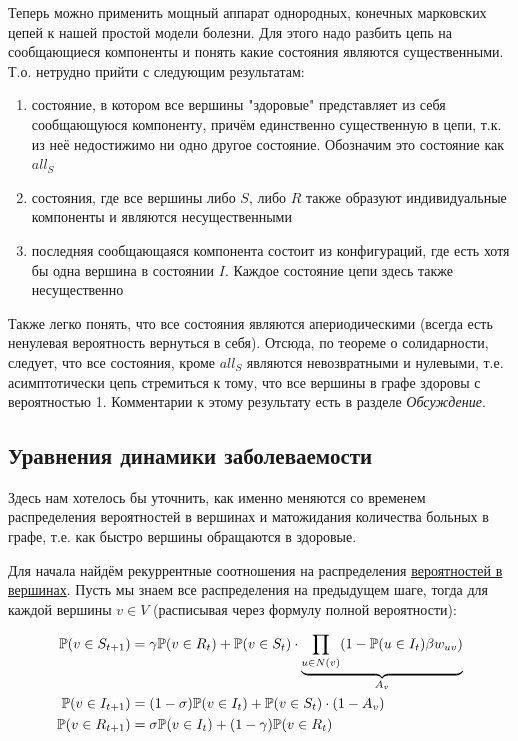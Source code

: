 	Теперь можно применить мощный аппарат однородных, конечных марковских цепей к нашей простой модели болезни. Для этого надо разбить цепь на сообщающиеся компоненты и понять какие состояния являются существенными. Т.о. нетрудно прийти с следующим результатам:
	
	\begin{enumerate}
		\item состояние, в котором все вершины "здоровые" представляет из себя сообщающуюся компоненту, причём единственно существенную в цепи, т.к. из неё недостижимо ни одно другое состояние. Обозначим это состояние как $all_S$
		\item состояния, где все вершины либо $S$, либо $R$ также образуют индивидуальные компоненты и являются несущественными 
		\item последняя сообщающаяся компонента состоит из конфигураций, где есть хотя бы одна вершина в состоянии $I$. Каждое состояние цепи здесь также несущественно
	\end{enumerate}

	Также легко понять, что все состояния являются апериодическими (всегда есть ненулевая вероятность вернуться в себя). Отсюда, по теореме о солидарности, следует, что все состояния, кроме $all_S$ являются невозвратными и нулевыми, т.е. асимптотически цепь стремиться к тому, что все вершины в графе здоровы с вероятностью 1. Комментарии к этому результату есть в разделе \textit{Обсуждение}.
	
	\subsection*{Уравнения динамики заболеваемости}
	
	Здесь нам хотелось бы уточнить, как именно меняются со временем распределения вероятностей в вершинах и матожидания количества больных в графе, т.е. как быстро вершины обращаются в здоровые.
	
	Для начала найдём рекуррентные соотношения на распределения \hyperlink{ver_distr}{вероятностей в вершинах}. Пусть мы знаем все распределения на предыдущем шаге, тогда для каждой вершины $v \in V$ (расписывая через формулу полной вероятности):
	
	\begin{align*}
		\mathbb{P}(v \in S_{t+1}) &= \gamma \mathbb{P}(v \in R_t) + \mathbb{P}(v \in S_t) \cdot \underbrace{\prod\limits_{u \in N(v)} (1 - \mathbb{P}(u \in I_t) \beta w_{uv})}_{A_v} \\
		\mathbb{P}(v \in I_{t+1}) &= (1 - \sigma) \mathbb{P}(v \in I_t) + \mathbb{P}(v \in S_t) \cdot (1 - A_v) \\
		\mathbb{P}(v \in R_{t+1}) &= \sigma \mathbb{P}(v \in I_t) + (1 - \gamma) \mathbb{P}(v \in R_t) 
	\end{align*}

